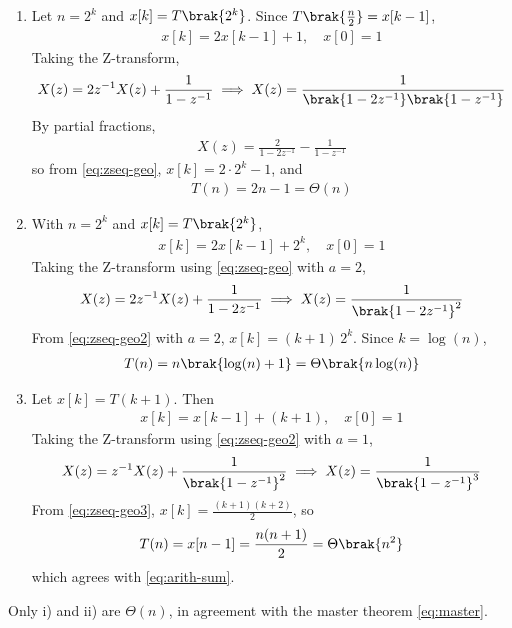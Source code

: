 \begin{enumerate}[label=\thesubsection.\arabic*, ref=\thesubsection.\theenumi]
\begin{enumerate}[label=\roman*)]
  \item Let $n = 2^{k}$ and $x[k] = T\brak{2^{k}}$. Since
  $T\brak{\frac{n}{2}} = x[k-1]$,
  \begin{align}
  x[k] = 2x[k-1] + 1, \quad x[0] = 1
  \end{align}
  Taking the Z-transform,
  \begin{align}
  X(z) = 2z^{-1}X(z) + \frac{1}{1 - z^{-1}}
  \implies X(z) = \frac{1}{\brak{1 - 2z^{-1}}\brak{1 - z^{-1}}}
  \end{align}
  By partial fractions,
  \begin{align}
  X(z) = \frac{2}{1 - 2z^{-1}} - \frac{1}{1 - z^{-1}}
  \end{align}
  so from \eqref{eq:zseq-geo}, $x[k] = 2 \cdot 2^{k} - 1$, and
  \begin{align}
  T(n) = 2n - 1 = \Theta(n)
  \end{align}

  \item With $n = 2^{k}$ and $x[k] = T\brak{2^{k}}$,
  \begin{align}
  x[k] = 2x[k-1] + 2^{k}, \quad x[0] = 1
  \end{align}
  Taking the Z-transform using \eqref{eq:zseq-geo} with $a = 2$,
  \begin{align}
  X(z) = 2z^{-1}X(z) + \frac{1}{1 - 2z^{-1}}
  \implies X(z) = \frac{1}{\brak{1 - 2z^{-1}}^{2}}
  \end{align}
  From \eqref{eq:zseq-geo2} with $a = 2$, $x[k] = (k+1)\,2^{k}$. Since
  $k = \log(n)$,
  \begin{align}
  T(n) = n\brak{\log(n) + 1} = \Theta\brak{n\log(n)}
  \end{align}

  \item Let $x[k] = T(k+1)$. Then
  \begin{align}
  x[k] = x[k-1] + (k+1), \quad x[0] = 1
  \end{align}
  Taking the Z-transform using \eqref{eq:zseq-geo2} with $a = 1$,
  \begin{align}
  X(z) = z^{-1}X(z) + \frac{1}{\brak{1 - z^{-1}}^{2}}
  \implies X(z) = \frac{1}{\brak{1 - z^{-1}}^{3}}
  \end{align}
  From \eqref{eq:zseq-geo3}, $x[k] = \frac{(k+1)(k+2)}{2}$, so
  \begin{align}
  T(n) = x[n-1] = \frac{n(n+1)}{2} = \Theta\brak{n^{2}}
  \end{align}
  which agrees with \eqref{eq:arith-sum}.
\end{enumerate}
Only i) and ii) are $\Theta(n)$, in agreement with the master theorem
\eqref{eq:master}.


\end{enumerate}
